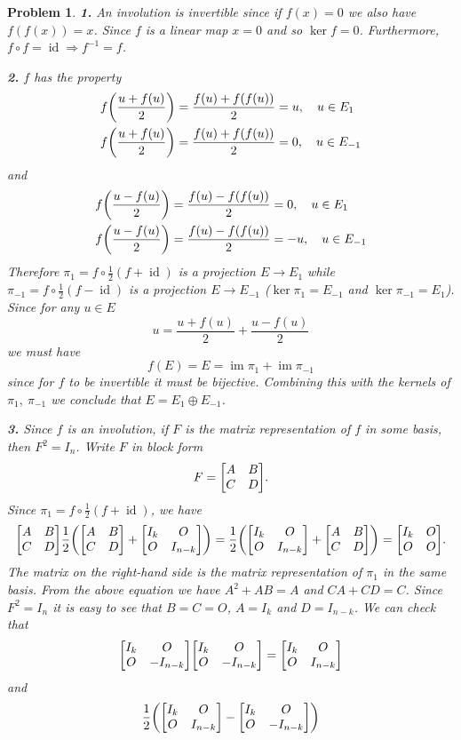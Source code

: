 \documentclass{article}
\newcommand{\subno}[1]{\par\noindent\textbf{#1}}
\DeclareMathOperator{\im}{im}
\DeclareMathOperator{\id}{id}
\theoremstyle{pprop}
\newtheorem{problem}{Problem}[section]
\begin{document}
\begin{problem}
\subno{1.} An involution is invertible since if $f(x)=0$ we also have $f(f(x))=x$. Since $f$ is a linear map $x=0$ 
and so $\ker f=\qty{0}$. Furthermore, $f \circ f = \id \Rightarrow f^{-1} = f$. 
\subno{2.} $f$ has the property  
\[
\begin{aligned}
f\qty(\frac{u+f(u)}{2}) & =\frac{f(u)+f(f(u))}{2}=u, \quad u \in E_1 \\
f\qty(\frac{u+f(u)}{2}) & =\frac{f(u)+f(f(u))}{2}=0, \quad u \in E_{-1} 
\end{aligned}
\] 
and 
\[
\begin{aligned}
f\qty(\frac{u-f(u)}{2}) & =\frac{f(u)-f(f(u))}{2}=0, \quad u \in E_1 \\
f\qty(\frac{u-f(u)}{2}) & =\frac{f(u)-f(f(u))}{2}=-u, \quad u \in E_{-1}   
\end{aligned}
\] 
Therefore $\pi_1 = f \circ \frac12 (f + \id)$ is a projection $E \to E_1$ while $\pi_{-1} = f \circ \frac12 (f - \id)$ is a projection $E \to E_{-1}$ 
($\ker \pi_1 = E_{-1}$ and $\ker \pi_{-1} = E_1$). Since for any $u \in E$
\[
u = \frac{u+f(u)}{2} + \frac{u-f(u)}{2}
\]
we must have  
\[
f(E)= E =\im  \pi_1 +  \im \pi_{-1} 
\]
since for $f$ to be invertible it must be bijective. Combining this with the kernels of $\pi_1, \ \pi_{-1}$ 
we conclude that $E = E_1 \oplus E_{-1}$. 
\subno{3.} Since $f$ is an involution, if $F$ is the matrix representation of $f$ in some basis, then $F^2=I_n$. Write $F$ in block form 
\[
F = \mqty[ A & B \\ C & D].
\]
Since $\pi_1 = f \circ \frac12 (f + \id)$, we have
\[
\mqty[ A & B \\ C & D] \frac12 \qty(\mqty[ A & B \\ C & D] + \mqty[ I_k & O \\ O & I_{n-k}])
=
\frac12 \qty(\mqty[ I_k & O \\ O & I_{n-k}] + \mqty[ A & B \\ C & D])
=
\mqty[I_k & O \\ O & O].
\]
The matrix on the right-hand side is the matrix representation of $\pi_1$ in the same basis. From the above equation we have $A^2 + AB = A$ and $CA + CD = C$. Since $F^2=I_n$ 
it is easy to see that $B=C=O$, $A=I_k$ and $D=I_{n-k}$. We can check that 
\[
\mqty[ I_k & O \\ O & -I_{n-k}] \mqty[ I_k & O \\ O & -I_{n-k}] =\mqty[ I_k & O \\ O & I_{n-k}] 
\]
and 
\[
\frac12 \qty(\mqty[ I_k & O \\ O & I_{n-k}] - \mqty[ I_k & O \\ O & -I_{n-k}])
\]
\end{problem}
\end{document}
